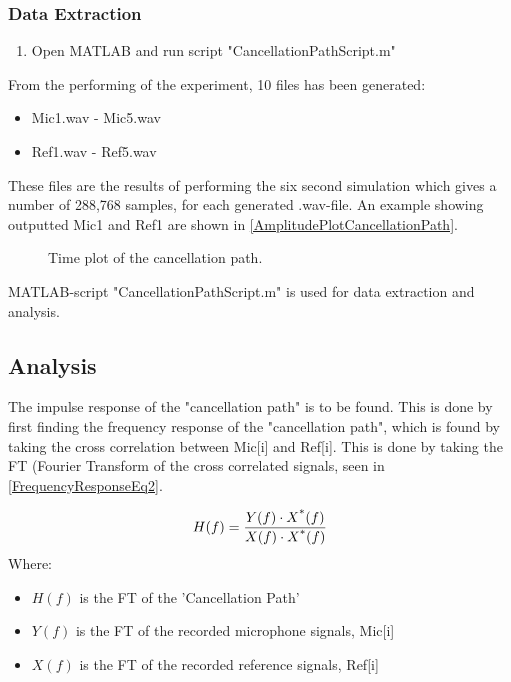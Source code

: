 \subsubsection{Data Extraction}
\begin{enumerate}
	\item Open MATLAB\textsuperscript{\textregistered} and run script "CancellationPathScript.m"
\end{enumerate}
From the performing of the experiment, 10 files has been generated:
\begin{itemize}
	\item Mic1.wav - Mic5.wav
	\item Ref1.wav - Ref5.wav
\end{itemize}

These files are the results of performing the six second simulation which gives a number of 288,768 samples, for each generated .wav-file.
An example showing outputted Mic1 and Ref1 are shown in  \autoref{AmplitudePlotCancellationPath}.

\begin{figure}[H]
	\centering
	
	\caption{Time plot of the cancellation path.}
	\label{AmplitudePlotCancellationPath}
\end{figure}

MATLAB\textsuperscript{\textregistered}-script "CancellationPathScript.m" is used for data extraction and analysis.



\subsection{Analysis}
The impulse response of the "cancellation path" is to be found.
This is done by first finding the frequency response of the "cancellation path", which is found by taking the cross correlation between Mic[i] and Ref[i]. This is done by taking the FT (Fourier Transform of the cross correlated signals, seen in \autoref{FrequencyResponseEq2}.



\begin{equation}\label{FrequencyResponseEq2}
H(f) = \frac{Y(f) \cdot X\textsuperscript{*}(f)}{X(f) \cdot X\textsuperscript{*}(f)}
\end{equation}
Where:
\begin{itemize}
	\item $H(f)$ is the FT of the 'Cancellation Path'
	\item $Y(f)$ is the FT of the recorded microphone signals, Mic[i]
	\item $X(f)$ is the FT of the recorded reference signals, Ref[i]
\end{itemize}

